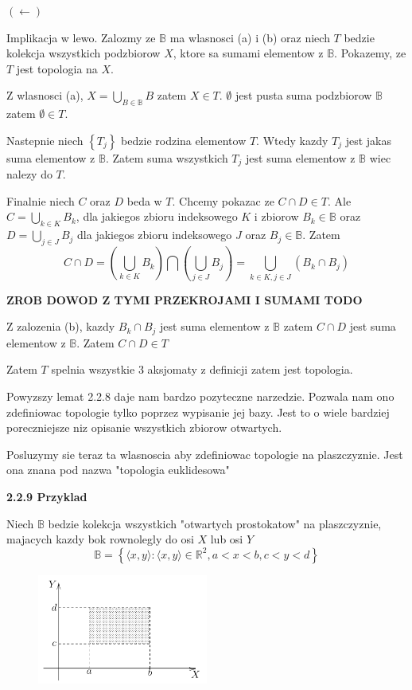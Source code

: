 \documentclass{article}
\begin{document}
$(\leftarrow)$

Implikacja w lewo. Zalozmy ze $\mathbb{B}$ ma wlasnosci (a) i (b) oraz niech $T$ bedzie kolekcja wszystkich podzbiorow $X$, ktore sa sumami elementow z $\mathbb{B}$. Pokazemy, ze $T$ jest topologia na $X$.

Z wlasnosci (a), $X = \bigcup\limits_{B \in \mathbb{B}}B$ zatem  $X \in T$. $\emptyset$ jest pusta suma podzbiorow $\mathbb{B}$ zatem $\emptyset \in T$.

Nastepnie niech $\left\{ T_{j} \right\}$ bedzie rodzina elementow $T$. Wtedy kazdy $T_{j}$ jest jakas suma elementow z $\mathbb{B}$. Zatem suma wszystkich $T_{j}$ jest suma elementow z $\mathbb{B}$ wiec nalezy do $T$.

Finalnie niech $C$ oraz $D$ beda w $T$. Chcemy pokazac ze $C \cap D \in T$. Ale $C = \bigcup\limits_{k \in K}B_{k}$, dla jakiegos zbioru indeksowego $K$ i zbiorow $B_{k} \in \mathbb{B}$ oraz $D = \bigcup\limits_{j \in J}B_{j}$ dla jakiegos zbioru indeksowego $J$ oraz $B_{j} \in \mathbb{B}$. Zatem $$ C \cap D = \left(\bigcup\limits_{k \in K}B_{k}\right) \bigcap \left( \bigcup\limits_{j \in J}B_{j} \right) = \bigcup\limits_{k \in K, j \in J}(B_{k} \cap B_{j})$$

\textbf{ZROB DOWOD Z TYMI PRZEKROJAMI I SUMAMI TODO}

Z zalozenia (b), kazdy $B_{k} \cap B_{j}$ jest suma elementow z $\mathbb{B}$ zatem $C \cap D$ jest suma elementow z $\mathbb{B}$. Zatem $C \cap D \in T$ 

Zatem $T$ spelnia wszystkie 3 aksjomaty z definicji zatem jest topologia.

\vspace{1cm}

Powyzszy lemat 2.2.8 daje nam bardzo pozyteczne narzedzie. Pozwala nam ono zdefiniowac topologie tylko poprzez wypisanie jej bazy. Jest to o wiele bardziej poreczniejsze niz opisanie wszystkich zbiorow otwartych.

Posluzymy sie teraz ta wlasnoscia aby zdefiniowac topologie na plaszczyznie. Jest ona znana pod nazwa "topologia euklidesowa"

\textbf{2.2.9 Przyklad}

Niech $\mathbb{B}$ bedzie kolekcja wszystkich "otwartych prostokatow" na plaszczyznie, majacych kazdy bok rownolegly do osi $X$ lub osi $Y$
$$\mathbb{B} = \left\{ \langle x,y \rangle : \langle x,y \rangle \in \mathbb{R}^{2}, a<x<b, c<y<d   \right\}$$

\begin{figure}[h]
   \centering
   \includegraphics[width=0.5\textwidth]{rectangle2_2_9.png}
\end{figure}
\end{document}

